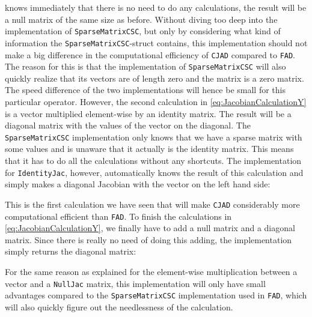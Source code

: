 knows immediately that there is no need to do any calculations, the result will be a null matrix of the same size as before. Without diving too deep into the implementation of \texttt{SparseMatrixCSC}, but only by considering what kind of information the \texttt{SparseMatrixCSC}-struct contains, this implementation should not make a big difference in the computational efficiency of \texttt{CJAD} compared to \texttt{FAD}. The reason for this is that the implementation of \texttt{SparseMatrixCSC} will also quickly realize that its vectors are of length zero and the matrix is a zero matrix. The speed difference of the two implementations will hence be small for this particular operator. However, the second calculation in \eqref{eq:JacobianCalculationY} is a vector multiplied element-wise by an identity matrix. The result will be a diagonal matrix with the values of the vector on the diagonal. The \texttt{SparseMatrixCSC} implementation only knows that we have a sparse matrix with some values and is unaware that it actually is the identity matrix. This means that it has to do all the calculations without any shortcuts.  The implementation for \texttt{IdentityJac}, however, automatically knows the result of this calculation and simply makes a diagonal Jacobian with the vector on the left hand side:

This is the first calculation we have seen that will make \texttt{CJAD} considerably more computational efficient than \texttt{FAD}. To finish the calculations in \eqref{eq:JacobianCalculationY}, we finally have to add a null matrix and a diagonal matrix. Since there is really no need of doing this adding, the implementation simply returns the diagonal matrix:

For the same reason as explained for the element-wise multiplication between a vector and a \texttt{NullJac} matrix, this implementation will only have small advantages compared to the \texttt{SparseMatrixCSC} implementation used in \texttt{FAD}, which will also quickly figure out the needlessness of the calculation.

